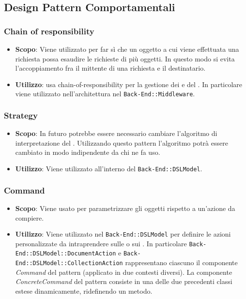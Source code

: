 \subsection{Design Pattern Comportamentali}

\subsubsection{Chain of responsibility}
\label{chain-of-responsibility}

\begin{itemize}

	\item \textbf{Scopo}: Viene utilizzato per far sì che un oggetto a cui viene effettuata una richiesta possa esaudire le richieste di più oggetti. In questo modo si evita l'accoppiamento fra il mittente di una richiesta e il destinatario.
	\item \textbf{Utilizzo}:  usa chain-of-responsibility per la gestione dei  e del . In particolare viene utilizzato nell'architettura nel  \texttt{Back-End::Middleware}.

\end{itemize}

\subsubsection{Strategy}

\begin{itemize}

	\item \textbf{Scopo}: In futuro potrebbe essere necessario cambiare l'algoritmo di interpretazione del . Utilizzando questo pattern l'algoritmo potrà essere cambiato in modo indipendente da chi ne fa uso.
	\item \textbf{Utilizzo}: Viene utilizzato all'interno del  \texttt{Back-End::DSLModel}.

\end{itemize}

\subsubsection{Command}

\begin{itemize}

	\item \textbf{Scopo}: Viene usato per parametrizzare gli oggetti rispetto a un'azione da compiere.
	\item \textbf{Utilizzo}: Viene utilizzato nel  \texttt{Back-End::DSLModel} per definire le azioni personalizzate da intraprendere sulle  o sui . In particolare \texttt{Back-End::DSLModel::DocumentAction} e \texttt{Back-End::DSLModel::CollectionAction} rappresentano ciascuno il componente \textit{Command} del pattern (applicato in due contesti diversi). La componente \textit{ConcreteCommand} del pattern consiste in una delle due precedenti classi estese dinamicamente, ridefinendo un metodo.

\end{itemize}
